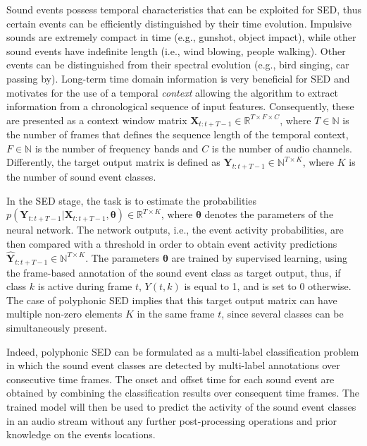 Sound events possess temporal characteristics that can be exploited for SED, thus certain events can be efficiently distinguished by their time evolution. Impulsive sounds are extremely compact in time (e.g., gunshot, object impact), while other sound events have indefinite length (i.e., wind blowing, people walking). Other events can be distinguished from their spectral evolution (e.g., bird singing, car passing by). Long-term time domain information is very beneficial for SED and motivates for the use of a temporal \textit{context} allowing the algorithm to extract information from a chronological sequence of input features. Consequently, these are presented as a context window matrix $\mathbf{X}_{t:t+T-1} \in \mathbb{R}^{T \times F \times C}$, where $T\in \mathbb{N}$ is the number of frames that defines the sequence length of the temporal context, $F\in \mathbb{N}$ is the number of frequency bands and $C$ is the number of audio channels. Differently, the target output matrix is defined as $\mathbf{Y}_{t:t+T-1} \in \mathbb{N}^{T \times K}$, where $K$ is the number of sound event classes.

In the SED stage, the task is to estimate the probabilities $p(\mathbf{Y}_{t:t+T-1}| \mathbf{X}_{t:t+T-1},  \boldsymbol{\theta}) \in \mathbb{R}^{T \times K}$, %
where $ \boldsymbol{\theta}$ denotes the parameters of the neural network.
The network outputs, i.e., the event activity probabilities, are then compared with a threshold in order to obtain event activity predictions $\mathbf{\hat{Y}}_{t:t+T-1}  \in \mathbb{N}^{T \times K}$.
The parameters $ \boldsymbol{\theta}$  are trained by supervised learning, using the frame-based annotation of the sound event class as target output, thus, if class $k$ is active during frame $t$, $Y(t,k)$ is equal to 1, and is set to 0 otherwise. The case of polyphonic SED implies that this target output matrix can have multiple non-zero elements $K$ in the same frame $t$, since several classes can be simultaneously present. 

Indeed, polyphonic SED can be formulated as a multi-label classification problem in which the sound event classes are detected by multi-label annotations over consecutive time frames. The onset and offset time for each sound event are obtained by combining the classification results over consequent time frames. The trained model will then be used to predict the activity of the sound event classes in an audio stream without any further post-processing operations and prior knowledge on the events locations.


